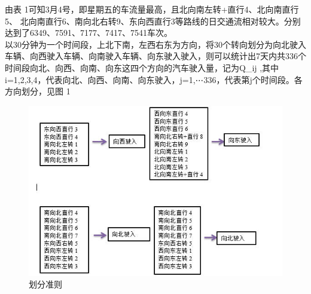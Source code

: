 \documentclass[UTF8]{article}
\begin{document}
    由表 1可知3月4号，即星期五的车流量最高，且北向南左转+直行4、北向南直行5、
    北向南直行6、南向北右转9、东向西直行3等路线的日交通流相对较大。分别达到了6349、7591、7177、7417、7541车次。\\
    以30分钟为一个时间段，上北下南，左西右东为方向，将30个转向划分为向北驶入车辆、向西驶入车辆、向南驶入车辆、向东驶入驶入，则可以统计出7天内共336个时间段向北、向西、向南、向东这四个方向的汽车驶入量，记为Q_ij  ,其中i=1,2,3,4，代表向北、向西、向南、向东驶入，j=1,⋯336，代表第j个时间段。各方向划分，见图 1\\
    \begin{figure}[h!]
        \includegraphics[width=\linewidth]{1.jpg}
        \caption{划分准则}
        \label{fig:ph1}
        
        
    \end{figure}


    
\end{document}
